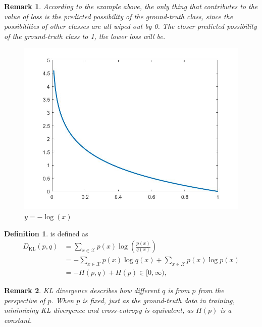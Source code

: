 \documentclass[a4paper]{article}
\theoremstyle{definition}
\newtheorem{definition}{Definition}
\theoremstyle{plain}
\newtheorem{remark}{Remark}
\newcounter{example}{Example}
\begin{document}
\begin{remark}
According to the example above, the only thing that contributes to the value of loss is the predicted possibility of the ground-truth class, since the possibilities of other classes are all wiped out by 0. The closer predicted possibility of the ground-truth class to 1, the lower loss will be.
\begin{figure}[H]
    \centering
    \includegraphics[scale=0.25]{figure/log.jpg}
    \caption{$y=-\log(x)$}
    \label{fig:my_label}
\end{figure}
\end{remark}

\begin{definition}
 is defined as
\begin{align*}
    D_{\text{KL}}(p,q)&=\sum _{x\in {\mathcal {X}}}p(x)\log \left({\frac {p(x)}{q(x)}}\right)\\
    &=-\sum _{x\in {\mathcal {X}}}p(x)\log q(x)+\sum _{x\in {\mathcal {X}}}p(x)\log p(x)\\
    &=-H(p,q)+H(p)\in[0,\infty),
\end{align*}
\end{definition}

\begin{remark}
KL divergence describes how different $q$ is from $p$ from the perspective of $p$. When $p$ is fixed, just as the ground-truth data in training, minimizing KL divergence and cross-entropy is equivalent, as $H(p)$ is a constant.
\end{remark}
\end{document}
